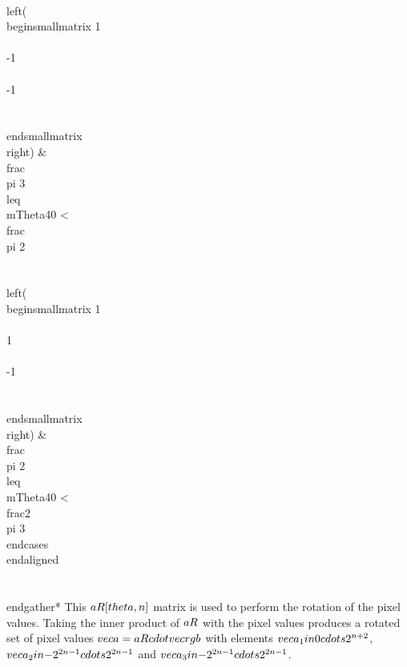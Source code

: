 \\left( \\begin{smallmatrix}  1 \\\\  -1 \\\\ -1\\\\ \\end{smallmatrix} \\right) & \\frac{\\pi }{3} \\leq  \\mTheta{4}{0}  < \\frac{  \\pi }{2} \\\\
\\left( \\begin{smallmatrix}  1 \\\\    1 \\\\ -1\\\\ \\end{smallmatrix} \\right) & \\frac{\\pi }{2} \\leq  \\mTheta{4}{0}  < \\frac{2\\pi }{3} 
\\end{cases} 
\\end{aligned} \\\\
\\end{gather*}
This $\\aR[\\theta, n]$ matrix is used to perform the rotation of the pixel values. Taking the inner product of $\\aR$ with the pixel values produces 
a rotated set of pixel values $\\vec{a} = \\aR \\cdot \\vec{rgb}$ with elements $ \\vec{a}_1 \\in \\{0 \\cdots 2^{n+2} \\}$,  $ \\vec{a}_2 \\in \\{-2^{2n-1} \\cdots 2^{2n-1} \\}$ and $ \\vec{a}_3 \\in \\{-2^{2n-1} \\cdots 2^{2n-1} \\}$. 
